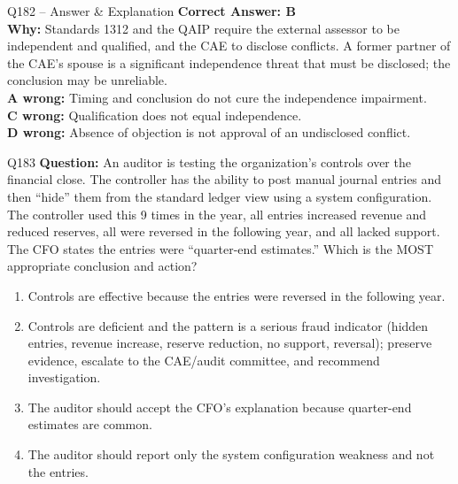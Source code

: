 \documentclass[aspectratio=169,10pt]{beamer}
\begin{document}
	\begin{frame}[t]{Q182 -- Answer \& Explanation}
		\small
		\textbf{Correct Answer: B} \\[4pt]
		\textbf{Why:} Standards 1312 and the QAIP require the external assessor to be independent and qualified, and the CAE to disclose conflicts. A former partner of the CAE's spouse is a significant independence threat that must be disclosed; the conclusion may be unreliable. \\[4pt]
		\textbf{A wrong:} Timing and conclusion do not cure the independence impairment. \\[2pt]
		\textbf{C wrong:} Qualification does not equal independence. \\[2pt]
		\textbf{D wrong:} Absence of objection is not approval of an undisclosed conflict.
	\end{frame}
	
	\begin{frame}[t]{Q183}
		\small
		\textbf{Question:} An auditor is testing the organization's controls over the financial close. The controller has the ability to post manual journal entries and then ``hide'' them from the standard ledger view using a system configuration. The controller used this 9 times in the year, all entries increased revenue and reduced reserves, all were reversed in the following year, and all lacked support. The CFO states the entries were ``quarter-end estimates.'' Which is the MOST appropriate conclusion and action?
		\begin{enumerate}[label=\Alph*.,itemsep=1pt,topsep=2pt]
			\item Controls are effective because the entries were reversed in the following year.
			\item Controls are deficient and the pattern is a serious fraud indicator (hidden entries, revenue increase, reserve reduction, no support, reversal); preserve evidence, escalate to the CAE/audit committee, and recommend investigation.
			\item The auditor should accept the CFO's explanation because quarter-end estimates are common.
			\item The auditor should report only the system configuration weakness and not the entries.
		\end{enumerate}
	\end{frame}
	
\end{document}
